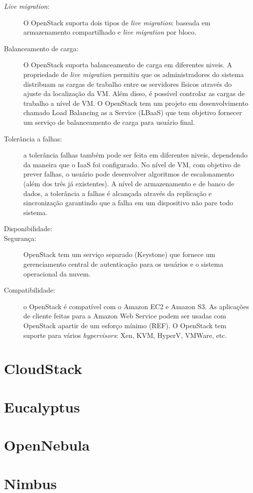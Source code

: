 \begin{description}

	\item[\textit{Live migration}:] O OpenStack suporta dois tipos de \textit{live migration}: baseada em armazenamento compartilhado e \textit{live migration} por bloco.

	\item[Balanceamento de carga:] O OpenStack suporta balanceamento de carga em diferentes niveis. A propriedade de \textit{live migration} permitiu que os administradores do sistema distribuam as cargas de trabalho entre os servidores físicos através do ajuste da localização da VM. Além disso, é possível controlar as cargas de trabalho a nível de VM. O OpenStack tem um projeto em desenvolvimento chamado Load Balancing as a Service (LBaaS) que tem objetivo fornecer um serviço de balanceamento de carga para usuário final.

	\item[Tolerância a falhas:] a tolerância  falhas também pode ser feita em diferentes niveis, dependendo da maneira que o IaaS foi configurado. No nível de VM, com objetivo de prever falhas, o usuário pode desenvolver algoritmos de escalonamento (além dos três já existentes). A nível de armazenamento e de banco de dados, a tolerância a falhas é alcançada através da replicação e sincronização garantindo que a falha em um dispositivo não pare todo sistema.

	\item[Disponibilidade:] 

	\item[Segurança:] OpenStack tem um serviço separado (Keystone) que fornece um gerenciamento central de autenticação para os usuários e o sistema operacional da nuvem.

	\item[Compatibilidade:] o OpenStack é compatível com o Amazon EC2 e Amazon S3. As aplicações de cliente feitas para a Amazon Web Service podem ser usadas com OpenStack apartir de um esforço mínimo (REF). O OpenStack tem suporte para vários \textit{hypervisors}: Xen, KVM, HyperV, VMWare, etc.

\end{description}


\section{CloudStack}

\section{Eucalyptus}

\section{OpenNebula}

\section{Nimbus}




